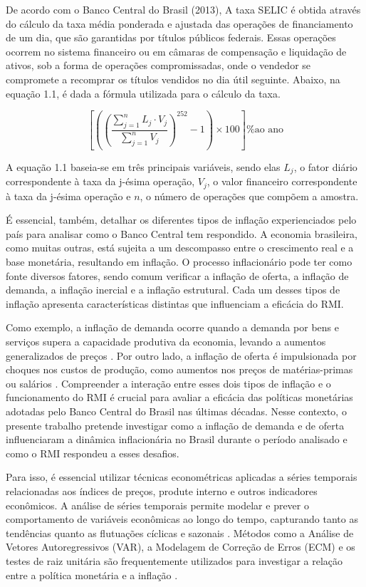 \documentclass[12pt,oneside,a4paper,chapter=TITLE,english,brazil,sumario=abnt-6027-2012]{abntex2}
\begin{document}
De acordo com o Banco Central do Brasil (2013), A taxa SELIC é obtida através do cálculo da taxa média ponderada e ajustada das operações de financiamento de um dia, que são garantidas por títulos públicos federais. Essas operações ocorrem no sistema financeiro ou em câmaras de compensação e liquidação de ativos, sob a forma de operações compromissadas, onde o vendedor se compromete a recomprar os títulos vendidos no dia útil seguinte. Abaixo, na equação 1.1, é dada a fórmula utilizada para o cálculo da taxa.

\begin{equation}
	\left[ \left( \left(\frac{\sum_{j=1}^{n} L_j \cdot V_j}{\sum_{j=1}^{n} V_j} \right)^{252} - 1 \right) \times 100 \right] \textrm{\% ao ano}
\end{equation}


A equação 1.1 baseia-se em três principais variáveis, sendo elas $L_j$, o fator diário correspondente à taxa da j-ésima operação, $V_j$, o valor financeiro correspondente à taxa da j-ésima operação e $n$, o número de operações que compõem a amostra.

É essencial, também, detalhar os diferentes tipos de inflação experienciados pelo país para analisar como o Banco Central tem respondido. A economia brasileira, como muitas outras, está sujeita a um descompasso entre o crescimento real e a base monetária, resultando em inflação. O processo inflacionário pode ter como fonte diversos fatores, sendo comum verificar a inflação de oferta, a inflação de demanda, a inflação inercial e a inflação estrutural. Cada um desses tipos de inflação apresenta características distintas que influenciam a eficácia do RMI.

Como exemplo, a inflação de demanda ocorre quando a demanda por bens e serviços supera a capacidade produtiva da economia, levando a aumentos generalizados de preços \cite{olivierblanchard_2013_macroeconomics}. Por outro lado, a inflação de oferta é impulsionada por choques nos custos de produção, como aumentos nos preços de matérias-primas ou salários \cite{blinder_2008_the}. Compreender a interação entre esses dois tipos de inflação e o funcionamento do RMI é crucial para avaliar a eficácia das políticas monetárias adotadas pelo Banco Central do Brasil nas últimas décadas. Nesse contexto, o presente trabalho pretende investigar como a inflação de demanda e de oferta influenciaram a dinâmica inflacionária no Brasil durante o período analisado e como o RMI respondeu a esses desafios.

Para isso, é essencial utilizar técnicas econométricas aplicadas a séries temporais relacionadas aos índices de preços, produte interno e outros indicadores econômicos. A análise de séries temporais permite modelar e prever o comportamento de variáveis econômicas ao longo do tempo, capturando tanto as tendências quanto as flutuações cíclicas e sazonais \cite{enders_2015_applied}. Métodos como a Análise de Vetores Autoregressivos (VAR), a Modelagem de Correção de Erros (ECM) e os testes de raiz unitária são frequentemente utilizados para investigar a relação entre a política monetária e a inflação \cite{hamilton_2020_time}.
\end{document}
